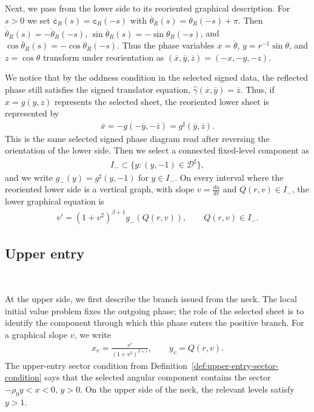 \documentclass{amsart}
\theoremstyle{plain}
\theoremstyle{mainintrothm}
\theoremstyle{definition}
\begin{document}
Next, we pass from the lower side to its reoriented graphical description.  For
$s>0$ we set $\overline{\mathtt c}_R(s)=\mathtt c_R(-s)$ with $\overline\theta_R(s)=\theta_R(-s)+\pi$. Then $\dot{\overline\theta}_R(s)=-\dot\theta_R(-s)$, $\sin\overline\theta_R(s)=-\sin\theta_R(-s)$, and $\cos\overline\theta_R(s)=-\cos\theta_R(-s)$. Thus the phase variables $x=\dot\theta$, $y=r^{-1}\sin\theta$, and
$z=\cos\theta$ transform under reorientation as $(\overline x,\overline y,\overline z)=(-x,-y,-z)$.

\medskip

We notice that by the oddness condition in the selected signed data, the reflected phase still
satisfies the signed translator equation, $\widehat\gamma(\overline x,\overline y)=\overline z$. Thus, if $x=g(y,z)$ represents the selected sheet, the reoriented lower sheet is
represented by
\begin{align*}
	\overline x
	=
	-g(-\overline y,-\overline z)
	=
	g^\sharp(\overline y,\overline z).
\end{align*}
This is the same selected signed phase diagram read after reversing the
orientation of the lower side. Then we select a connected fixed-level component as
\begin{align*}
	I_-
	\subset
	\{y:(y,-1)\in\mathcal D^\sharp\},
\end{align*}
and we write $g_-(y)=g^\sharp(y,-1)$ for $y\in I_-$.  On every interval where the
reoriented lower side is a vertical graph, with slope $v=\frac{du}{dr}$ and
$Q(r,v)\in I_-$, the lower graphical equation is
\begin{align}
	\label{eq:reoriented-lower-graphical-equation}
	v'
	=
	(1+v^2)^{\beta+1}g_-(Q(r,v)),
	\qquad
	Q(r,v)\in I_-.
\end{align}

\subsection{Upper entry}\,
\label{subsec:upper-entry-sector}

At the upper side, we first describe the branch issued from the neck.  The local initial value
problem fixes the outgoing phase; the role of the selected sheet is to identify
the component through which this phase enters the positive branch.  For a
graphical slope $v$, we write
\begin{align*}
	x_v
	=
	\frac{v'}{(1+v^2)^{\beta+1}},
	\qquad
	y_v
	=
	Q(r,v).
\end{align*}
The upper-entry sector condition from
Definition~\ref{def:upper-entry-sector-condition} says that the selected
angular component contains the sector $-\rho_0y<x<0$, $y>0$.  On the
upper side of the neck, the relevant levels satisfy $y>1$.
\end{document}
